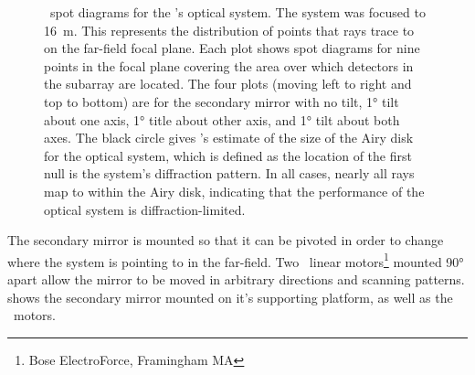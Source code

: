 \begin{figure}
\begin{tabular}{lr}
\end{tabular}
\caption{
\ZEMAX\ spot diagrams for the \Imager's optical system.
The system was focused to \SI{16}{\m}.
This represents the distribution of points that rays trace to on the far-field focal plane.
Each plot shows spot diagrams for nine points in the focal plane covering the area over which detectors in the subarray are located.
The four plots (moving left to right and top to bottom) are for the secondary mirror with no tilt, \ang{1} tilt about one axis, \ang{1} title about other axis, and \ang{1} tilt about both axes.
The black circle gives \ZEMAX's estimate of the size of the Airy disk for the optical system, which is defined as the location of the first null is the system's diffraction pattern.
In all cases, nearly all rays map to within the Airy disk, indicating that the performance of the optical system is diffraction-limited.
}
\label{fig:ch4-spot-diagrams}
\end{figure}

The secondary mirror is mounted so that it can be pivoted in order to change where the system is pointing to in the far-field.
Two \BOSE\ linear motors\footnote{Bose ElectroForce, Framingham MA} mounted \ang{90} apart allow the mirror to be moved in arbitrary directions and scanning patterns.
 shows the secondary mirror mounted on it's supporting platform, as well as the \BOSE\ motors.

